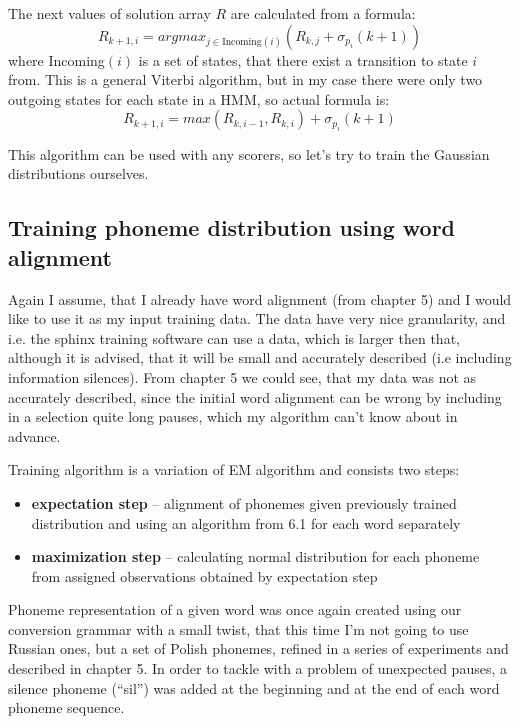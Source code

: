 \documentclass[12pt,a4paper,english]{article}
\begin{document}
The next values of solution array $R$ are calculated from a formula:
\begin{equation}
    R_{k+1, i} = argmax_{j \in \text{Incoming$(i)$}} (R_{k,j} + \sigma_{p_i}(k+1))
\end{equation}
where Incoming$(i)$ is a set of states, that there exist a transition to state $i$ from. \newline
This is a general Viterbi algorithm, but in my case there were only two outgoing states for each state in a HMM, so actual formula is:
\begin{equation}
    R_{k+1, i} = max(R_{k, i-1}, R_{k, i}) + \sigma_{p_i}(k+1)
\end{equation}

This algorithm can be used with any scorers, so let's try to train the Gaussian distributions ourselves.

\newpage
\subsection{Training phoneme distribution using word alignment}

Again I assume, that I already have word alignment (from chapter 5) and I would like to use it as my input training data. The data have very nice granularity,
and i.e. the sphinx training software can use a data, which is larger then that, although it is advised, that it will be small and accurately described (i.e including information silences). \newline
From chapter 5 we could see, that my data was not as accurately described, since the initial word alignment can be wrong by including in a selection quite long pauses, which my algorithm can't know about in advance. \newline

Training algorithm is a variation of EM algorithm and consists two steps:
\begin{itemize}
    \item \textbf{expectation step} – alignment of phonemes given previously trained distribution and using an algorithm from 6.1 for each word separately
    \item \textbf{maximization step} – calculating normal distribution for each phoneme from assigned observations obtained by expectation step
\end{itemize}

Phoneme representation of a given word was once again created using our conversion grammar with a small twist, that this time I'm not going to use Russian ones, but a set of Polish phonemes, refined in a series of experiments and described in chapter 5. \newline
In order to tackle with a problem of unexpected pauses, a silence phoneme (“sil”) was added at the beginning and at the end of each word phoneme sequence. \newline
\end{document}
